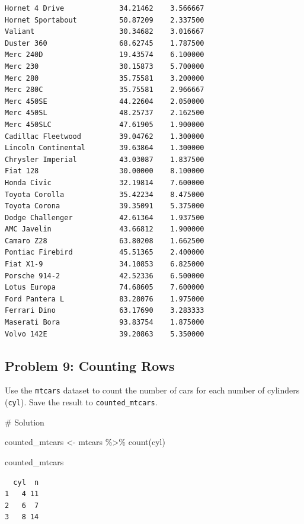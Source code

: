\documentclass[
  letterpaper,
  DIV=11,
  numbers=noendperiod]{scrreprt}
\newenvironment{Shaded}{\begin{snugshade}}{\end{snugshade}}
\newcommand{\CommentTok}[1]{\textcolor[rgb]{0.37,0.37,0.37}{#1}}
\newcommand{\FunctionTok}[1]{\textcolor[rgb]{0.28,0.35,0.67}{#1}}
\newcommand{\NormalTok}[1]{\textcolor[rgb]{0.00,0.23,0.31}{#1}}
\newcommand{\OtherTok}[1]{\textcolor[rgb]{0.00,0.23,0.31}{#1}}
\newcommand{\SpecialCharTok}[1]{\textcolor[rgb]{0.37,0.37,0.37}{#1}}
\begin{document}
\begin{verbatim}
Hornet 4 Drive             34.21462    3.566667
Hornet Sportabout          50.87209    2.337500
Valiant                    30.34682    3.016667
Duster 360                 68.62745    1.787500
Merc 240D                  19.43574    6.100000
Merc 230                   30.15873    5.700000
Merc 280                   35.75581    3.200000
Merc 280C                  35.75581    2.966667
Merc 450SE                 44.22604    2.050000
Merc 450SL                 48.25737    2.162500
Merc 450SLC                47.61905    1.900000
Cadillac Fleetwood         39.04762    1.300000
Lincoln Continental        39.63864    1.300000
Chrysler Imperial          43.03087    1.837500
Fiat 128                   30.00000    8.100000
Honda Civic                32.19814    7.600000
Toyota Corolla             35.42234    8.475000
Toyota Corona              39.35091    5.375000
Dodge Challenger           42.61364    1.937500
AMC Javelin                43.66812    1.900000
Camaro Z28                 63.80208    1.662500
Pontiac Firebird           45.51365    2.400000
Fiat X1-9                  34.10853    6.825000
Porsche 914-2              42.52336    6.500000
Lotus Europa               74.68605    7.600000
Ford Pantera L             83.28076    1.975000
Ferrari Dino               63.17690    3.283333
Maserati Bora              93.83754    1.875000
Volvo 142E                 39.20863    5.350000
\end{verbatim}

\subsection*{Problem 9: Counting Rows}\label{problem-9-counting-rows}

Use the \texttt{mtcars} dataset to count the number of cars for each
number of cylinders (\texttt{cyl}). Save the result to
\texttt{counted\_mtcars}.

\begin{Shaded}
\begin{Highlighting}[]
\CommentTok{\# Solution}

\NormalTok{counted\_mtcars }\OtherTok{\textless{}{-}}\NormalTok{ mtcars }\SpecialCharTok{\%\textgreater{}\%}
  \FunctionTok{count}\NormalTok{(cyl)}

\NormalTok{counted\_mtcars}
\end{Highlighting}
\end{Shaded}

\begin{verbatim}
  cyl  n
1   4 11
2   6  7
3   8 14
\end{verbatim}
\end{document}

